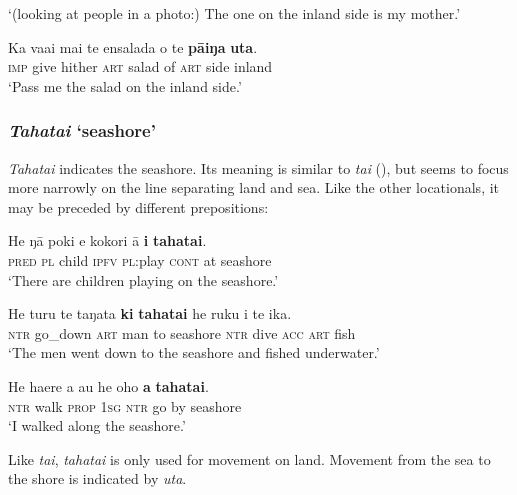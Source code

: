 \glt 
‘(looking at people in a photo:) The one on the inland side is my mother.’ \textstyleExampleref{[R411.057]} 
\z

\ea\label{ex:3.165}
\gll Ka va{\ꞌ}ai mai te ensalada o te \textbf{pā{\ꞌ}iŋa} \textbf{{\ꞌ}uta}. \\
\textsc{imp} give hither \textsc{art} salad of \textsc{art} side inland \\

\glt 
‘Pass me the salad on the inland side.’ \textstyleExampleref{[Notes]}
\z

\subsubsection{\textit{Tahatai} ‘seashore’}\label{sec:3.6.3.2}
\textit{Tahatai} indicates the seashore. Its meaning is similar to \textit{tai} (), but seems to focus more narrowly on the line separating land and sea. Like the other locationals, it may be preceded by different prepositions:

\ea\label{ex:3.166}
\gll He ŋā poki e kokori {\ꞌ}ā \textbf{{\ꞌ}i} \textbf{tahatai}. \\
\textsc{pred} \textsc{pl} child \textsc{ipfv} \textsc{pl}:play \textsc{cont} at seashore \\

\glt 
‘There are children playing on the seashore.’ \textstyleExampleref{[R415.950]} 
\z

\ea\label{ex:3.167}
\gll He turu te taŋata \textbf{ki} \textbf{tahatai} he ruku i te ika. \\
\textsc{ntr} go\_down \textsc{art} man to seashore \textsc{ntr} dive \textsc{acc} \textsc{art} fish \\

\glt 
‘The men went down to the seashore and fished underwater.’ \textstyleExampleref{[R372.016]} 
\z

\ea\label{ex:3.168}
\gll He ha{\ꞌ}ere a au he oho \textbf{a} \textbf{tahatai}. \\
\textsc{ntr} walk \textsc{prop} \textsc{1sg} \textsc{ntr} go by seashore \\

\glt
‘I walked along the seashore.’ \textstyleExampleref{[R475.010]} 
\z


Like \textit{tai}, \textit{tahatai} is only used for movement on land. Movement from the sea to the shore is indicated by \textit{{\ꞌ}uta}.

